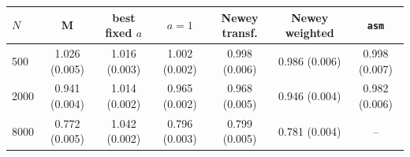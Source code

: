 \begin{tabular}{lcccccc}
\toprule
$N$ & M & best fixed $a$ & $a=1$ & Newey transf. & Newey weighted & \texttt{asm} \\
\midrule
500 & 1.026 (0.005) & 1.016 (0.003) & 1.002 (0.002) & 0.998 (0.006) & 0.986 (0.006) & 0.998 (0.007) \\
2000 & 0.941 (0.004) & 1.014 (0.002) & 0.965 (0.002) & 0.968 (0.005) & 0.946 (0.004) & 0.982 (0.006) \\
8000 & 0.772 (0.005) & 1.042 (0.002) & 0.796 (0.003) & 0.799 (0.005) & 0.781 (0.004) & -- \\
\bottomrule
\end{tabular}

